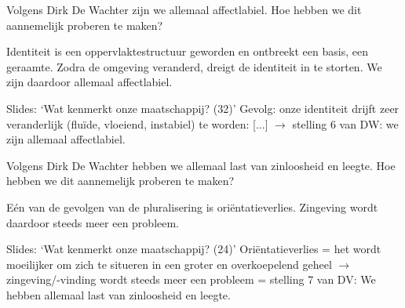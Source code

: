 \documentclass[main.tex]{subfiles}
\begin{document}
\begin{examenvraag}
    \begin{vraag}
        Volgens Dirk De Wachter zijn we allemaal affectlabiel. Hoe hebben we dit aannemelijk proberen te maken?
    \end{vraag}

    \begin{antwoord}
        Identiteit is een oppervlaktestructuur geworden en ontbreekt een basis, een geraamte. Zodra de omgeving veranderd, dreigt de identiteit in te storten.
        We zijn daardoor allemaal affectlabiel.
        \begin{citaat}{Slides: `Wat kenmerkt onze maatschappij? (32)'}
            Gevolg: onze identiteit drijft zeer veranderlijk (flu\"ide, vloeiend, instabiel) te worden:
            [...]
            $\rightarrow$ stelling 6 van DW: we zijn allemaal affectlabiel.
        \end{citaat}
    \end{antwoord}
\end{examenvraag}


\begin{examenvraag}
    \begin{vraag}
        Volgens Dirk De Wachter hebben we allemaal last van zinloosheid en leegte. Hoe hebben we dit aannemelijk proberen te maken?
    \end{vraag}

    \begin{antwoord}
        E\'en van de gevolgen van de pluralisering is ori\"entatieverlies.
        Zingeving wordt daardoor steeds meer een probleem.
        \begin{citaat}{Slides: `Wat kenmerkt onze maatschappij? (24)'}
            Ori\"entatieverlies = het wordt moeilijker om zich te situeren in een groter en overkoepelend geheel $\rightarrow$ zingeving/-vinding wordt steeds meer een probleem = stelling 7 van DV: We hebben allemaal last van zinloosheid en leegte.
        \end{citaat}
    \end{antwoord}
\end{examenvraag}
\end{document}
